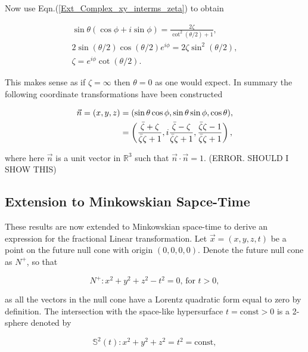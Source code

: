 \noindent Now use Eqn.(\ref{Ext_Complex_xy_interms_zeta}) to obtain

\begin{gather*}
\sin{\theta}(\cos{\phi} +i \sin{\phi}) = \frac{2\zeta}{\cot^2{\left(\theta/2\right)} + 1 }, \\
2\sin{\left(\theta/2\right)}\cos{\left(\theta/2\right)}e^{i\phi} = 2\zeta \sin^2{\left(\theta/2\right)}, \\
\zeta = e^{i\phi}\cot{\left(\theta/2\right)}. 
\end{gather*}

\noindent This makes sense as if $\zeta = \infty$ then $\theta = 0$ as one would expect. In summary the following coordinate transformations have been constructed

\begin{align}
\vec{n} = (x, y, z) & = (\sin{\theta}\cos{\phi}, \sin{\theta}\sin{\phi}, \cos{\theta}), \\ \label{Ext_Complex_Vec_n}
&
\begin{Huge}
                     = \left( \frac{\bar{\zeta} + \zeta}{\bar{\zeta}\zeta + 1}  ,i\frac{\bar{\zeta} - \zeta}{\bar{\zeta}\zeta + 1}, \frac{\bar{\zeta}\zeta - 1}{\bar{\zeta}\zeta + 1}  \right),
\end{Huge}
\end{align}

\noindent where here $\vec{n}$ is a unit vector in $\mathbb{R}^3$ such that $\vec{n} \cdot \vec{n} = 1$. (ERROR. SHOULD I SHOW THIS)

\subsection{Extension to Minkowskian Sapce-Time}

These results are now extended to Minkowskian space-time to derive an expression for the fractional Linear transformation. Let $\vec{x} = (x,y,z,t)$ be a point on the future null cone with origin $(0,0,0,0)$. Denote the future null cone as $N^{+}$, so that 

\begin{equation*}
N^+ : x^2 + y^2 + z^2 - t^2 = 0 \text{,  for  } t>0,
\end{equation*}

\noindent as all the vectors in the null cone have a Lorentz quadratic form equal to zero by definition. The intersection with the space-like hypersurface $t = \text{const}>0$ is a 2-sphere denoted by 

\begin{equation}\label{Ext_Complex_2Sphere_Definition}
\mathbb{S}^2 (t) : x^2 + y^2 + z^2 = t^2 = \text{const}, 
\end{equation}

